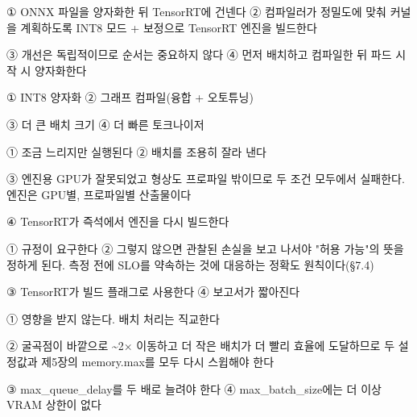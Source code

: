 
\begin{tbboptions}
  \item ① ONNX 파일을 양자화한 뒤 TensorRT에 건넨다        ② 컴파일러가 정밀도에 맞춰 커널을 계획하도록 INT8 모드 + 보정으로 TensorRT 엔진을 빌드한다
  \item ③ 개선은 독립적이므로 순서는 중요하지 않다        ④ 먼저 배치하고 컴파일한 뒤 파드 시작 시 양자화한다
\end{tbboptions}


\begin{tbboptions}
  \item ① INT8 양자화        ② 그래프 컴파일(융합 + 오토튜닝)
  \item ③ 더 큰 배치 크기        ④ 더 빠른 토크나이저
\end{tbboptions}


\begin{tbboptions}
  \item ① 조금 느리지만 실행된다        ② 배치를 조용히 잘라 낸다
  \item ③ 엔진용 GPU가 잘못되었고 형상도 프로파일 밖이므로 두 조건 모두에서 실패한다. 엔진은 GPU별, 프로파일별 산출물이다
  \item ④ TensorRT가 즉석에서 엔진을 다시 빌드한다
\end{tbboptions}


\begin{tbboptions}
  \item ① 규정이 요구한다        ② 그렇지 않으면 관찰된 손실을 보고 나서야 "허용 가능"의 뜻을 정하게 된다. 측정 전에 SLO를 약속하는 것에 대응하는 정확도 원칙이다(§7.4)
  \item ③ TensorRT가 빌드 플래그로 사용한다        ④ 보고서가 짧아진다
\end{tbboptions}


\begin{tbboptions}
  \item ① 영향을 받지 않는다. 배치 처리는 직교한다
  \item ② 굴곡점이 바깥으로 \textasciitilde{}2× 이동하고 더 작은 배치가 더 빨리 효율에 도달하므로 두 설정값과 제5장의 memory.max를 모두 다시 스윕해야 한다
  \item ③ max\_queue\_delay를 두 배로 늘려야 한다        ④ max\_batch\_size에는 더 이상 VRAM 상한이 없다
\end{tbboptions}

